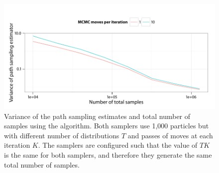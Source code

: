 \begin{figure}[t]
  \UseAltLinespread
  \includegraphics[width=\linewidth]{fig_src/MCMC_Iter_Var}
  \caption[Variance of path sampling estimator and total number of samples
  using \protect\smc algorithm]
  {Variance of the path sampling estimates and total number of samples
    using the \smc[2] algorithm. Both samplers use 1,000 particles but with
    different number of distributions $T$ and passes of \mcmc moves at each
    iteration $K$. The samplers are configured such that the value of $TK$ is the same for both samplers, and therefore they generate the same total number of samples.}
  \label{fig:fast mcmc iter}
\end{figure}
